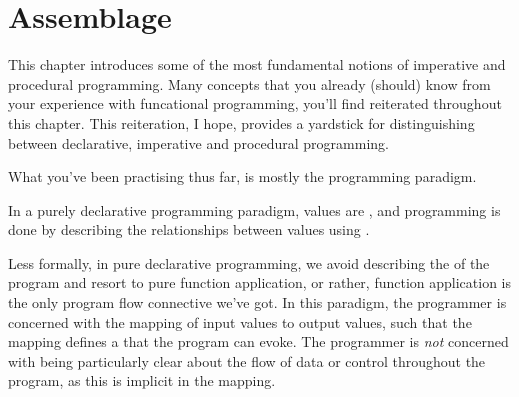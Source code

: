 \chapter{Assemblage}

%
%
%
%
%



This chapter introduces some of the most fundamental notions of imperative and
procedural programming.  Many concepts that you already (should) know from your
experience with funcational programming, you'll find reiterated throughout this
chapter.  This reiteration, I hope, provides a yardstick for distinguishing
between declarative, imperative and procedural programming.

\vspace{0.5in}

What you've been practising thus far, is mostly the 
programming paradigm.

\begin{definition}

In a purely declarative programming paradigm, values are , and
programming is done by describing the relationships between values using
.

\end{definition}


Less formally, in pure declarative programming, we avoid describing the
 of the program and resort to pure function application, or rather,
function application is the only program flow connective we've got.  In this
paradigm, the programmer is concerned with the mapping of input values to
output values, such that the mapping defines a  that
the program can evoke.  The programmer is \emph{not} concerned with being
particularly clear about the flow of data or control throughout the program, as
this is implicit in the mapping.


